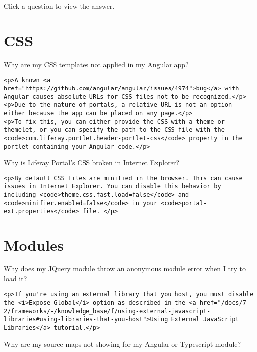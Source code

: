 Click a question to view the answer.

\section{CSS}\label{css}

\label{broken-css-angular-app}
{Why are my CSS templates not applied in my Angular app?~{}}

\begin{verbatim}
<p>A known <a href="https://github.com/angular/angular/issues/4974">bug</a> with Angular causes absolute URLs for CSS files not to be recognized.</p>
<p>Due to the nature of portals, a relative URL is not an option either because the app can be placed on any page.</p>
<p>To fix this, you can either provide the CSS with a theme or themelet, or you can specify the path to the CSS file with the <code>com.liferay.portlet.header-portlet-css</code> property in the portlet containing your Angular code.</p>
\end{verbatim}

\label{portal-css-broken-ie}
{Why is Liferay Portal's CSS broken in Internet Explorer?~{}}

\begin{verbatim}
<p>By default CSS files are minified in the browser. This can cause issues in Internet Explorer. You can disable this behavior by including <code>theme.css.fast.load=false</code> and <code>minifier.enabled=false</code> in your <code>portal-ext.properties</code> file. </p>
\end{verbatim}

\section{Modules}\label{modules-1}

\label{jquery-anonymous-module-error}
{Why does my JQuery module throw an anonymous module error when I try to
load it?~{}}

\begin{verbatim}
<p>If you're using an external library that you host, you must disable the <i>Expose Global</i> option as described in the <a href="/docs/7-2/frameworks/-/knowledge_base/f/using-external-javascript-libraries#using-libraries-that-you-host">Using External JavaScript Libraries</a> tutorial.</p>
\end{verbatim}

\label{source-maps-not-showing}
{Why are my source maps not showing for my Angular or Typescript
module?~{}}

